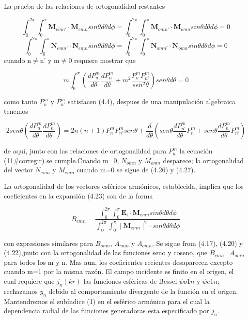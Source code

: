 \documentclass[graybox]{svmult}
\begin{document}
La prueba de las relaciones de ortogonalidad restantes 

\begin{equation}
    \int_{0}^{2\pi}\int_{0}^{\pi} \textbf{M}_{emn'} \cdot \textbf{M}_{emn} sin\theta d\theta d\phi =    \int_{0}^{2\pi}\int_{0}^{\pi} \textbf{M}_{omn'} \cdot \textbf{M}_{omn} sin\theta d\theta d\phi= 0 
\end{equation}
\begin{equation}
    \int_{0}^{2\pi}\int_{0}^{\pi} \textbf{N}_{emn'} \cdot \textbf{N}_{emn} sin\theta d\theta d\phi =    \int_{0}^{2\pi}\int_{0}^{\pi} \textbf{N}_{omn'} \cdot \textbf{N}_{omn} sin\theta d\theta d\phi= 0 
\end{equation} 
 cuando n$\neq$n' y m$\neq$0 requiere mostrar que
 
 \begin{equation}
    m \int_{0}^{\pi} (\frac{dP_{n}^{m}}{d\theta}\frac{dP_{n}^{m}}{d\theta}+ m^{2}\frac{P_{n}^{m}P_{n'}^{m}}{sen^2\theta})sen\theta d\theta = 0
\end{equation}

como tanto $P_{n}^{m}$ y $P_{n'}^{m}$ satisfacen (4.4), despues de una manipulación algebraica tenemos

\begin{equation}
    2sen\theta(\frac{dP_{n}^{m}}{d\theta}\frac{dP_{n}^{m}}{d\theta})=2n(n+1)P_{n}^{m}P_{n'}^{m}sen\theta + \frac{d}{d\theta}(sen\theta\frac{dP_{n'}^{m}}{d\theta}P_{n}^{m}+sen\theta\frac{dP_{n}^{m}}{d\theta}P_{n'}^{m})
\end{equation}
 
 de aquí, junto con las relaciones de ortogonalidad para $P_{n}^{m}$ la ecuación (11#corregir) se cumple.Cuando m=0, $N_{omn}$ y $M_{omn}$ desparece; la ortogonalidad del vector $N_{emn}$ y $M_{emn}$ cuando m=0 se sigue de (4.26) y (4.27).

La ortogonalidad de los vectores esféricos armónicos, establecida, implica que los coeficientes en la expansión (4.23) son de la forma

\begin{equation}
    B_{emn}=\frac{\int_{0}^{2\pi}\int_{0}^{\pi} \textbf{E}_{i} \cdot \textbf{M}_{emn} sin\theta d\theta d\phi}{\int_{0}^{2\pi}\int_{0}^{\pi} \mid \textbf{M}_{emn} \mid^{2} \cdot  sin\theta d\theta d\phi}
\end{equation}
 
 con expresiones similares para $B_{omn}$, $A_{emn}$ y $A_{omn}$. Se sigue from (4.17), (4.20) y (4.22),junto con la ortogonalidad de las funciones seno y coseno, que $B_{emn}$=$A_{omn}$ para todos los m y n. Mas aun, los coeficientes recientes desaparecen excepto cuando m=1 por la misma razón. El campo incidente es finito en el origen, el cual requiere que $j_{n}(kr)$ las funciones esféricas de Bessel $\psi{o1n}$ y $\psi{e1n}$; rechazamos $y_{n}$ debido al comportamiento divergente de la función en el origen. Mantendremos el subíndice (1) en el esférico armónico para el cual la dependencia radial de las funciones generadoras esta especificado por $j_{n}$.
 
\end{document}
